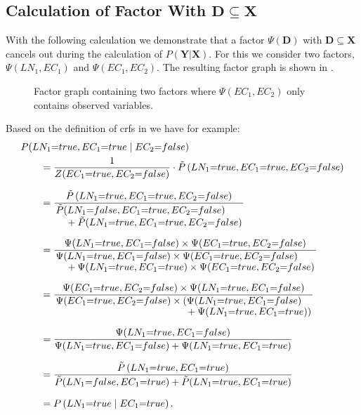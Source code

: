 \subsection{Calculation of Factor With $\mathbf{D}\subseteq\mathbf{X}$}\label{app:subsec-gd-example-calculation}
With the following calculation we demonstrate that a \gls{factor} $\Psi(\mathbf{D})$ with $\mathbf{D}\subseteq\mathbf{X}$ cancels out during the calculation of $P(\mathbf{Y}|\mathbf{X})$.
For this we consider two factors, $\Psi(LN_1,EC_1)$ and $\Psi(EC_1,EC_2)$.
The resulting \gls{factor graph} is shown in .
\begin{figure}[H]
\centering

\caption{%
  Factor graph containing two factors where $\Psi(EC_1,EC_2)$ only contains \glspl{observed variable}.
}
\label{fig:example-x-only-factor-graph}
\end{figure}
Based on the definition of \glspl{crf} in  we have for example:
\begin{equation*}
\begin{split}
  &P(LN_1{=}true,EC_1{=}true\mid EC_2{=}false)\\
  &\hspace{2em}=\frac{1}{Z(EC_1{=}true,EC_2{=}false)}\cdot\tilde{P}\left(LN_1{=}true,EC_1{=}true,EC_2{=}false\right)\\[0.25cm]
  &\hspace{2em}=\frac{\tilde{P}\left(LN_1{=}true,EC_1{=}true,EC_2{=}false\right)}{\splitfrac{\tilde{P}(LN_1{=}false,EC_1{=}true,EC_2{=}false)}
    {+\tilde{P}(LN_1{=}true,EC_1{=}true,EC_2{=}false)}}\\[0.25cm]
  &\hspace{2em}=\frac{\Psi(LN_1{=}true,EC_1{=}false)\times\Psi(EC_1{=}true,EC_2{=}false)}{\splitfrac{\Psi(LN_1{=}true,EC_1{=}false)\times\Psi(EC_1{=}true,EC_2{=}false)}
  {+\Psi(LN_1{=}true,EC_1{=}true)\times\Psi(EC_1{=}true,EC_2{=}false)}}\\[0.25cm]
  &\hspace{2em}=\frac{\Psi(EC_1{=}true,EC_2{=}false)\times\Psi(LN_1{=}true,EC_1{=}false)}{\splitfrac{\Psi(EC_1{=}true,EC_2{=}false)\times(\Psi(LN_1{=}true,EC_1{=}false)}
  {+\Psi(LN_1{=}true,EC_1{=}true))}}\\[0.25cm]
  &\hspace{2em}=\frac{\Psi(LN_1{=}true,EC_1{=}false)}{\Psi(LN_1{=}true,EC_1{=}false)+\Psi(LN_1{=}true,EC_1{=}true)}\\[0.25cm]
  &\hspace{2em}=\frac{\tilde{P}\left(LN_1{=}true,EC_1{=}true\right)}{\tilde{P}(LN_1{=}false,EC_1{=}true)+\tilde{P}(LN_1{=}true,EC_1{=}true)}\\[0.25cm]
  &\hspace{2em}={P}\left(LN_1{=}true\mid EC_1{=}true\right).\\
\end{split}
\end{equation*}

